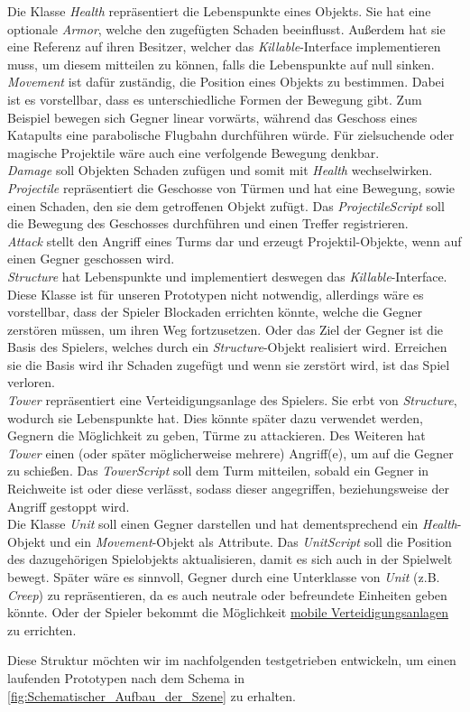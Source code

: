 Die Klasse \textit{Health} repräsentiert die Lebenspunkte eines Objekts. Sie hat eine optionale \textit{Armor}, welche den zugefügten Schaden beeinflusst. Außerdem hat sie eine Referenz auf ihren Besitzer, welcher das \textit{Killable}-Interface implementieren muss, um diesem mitteilen zu können, falls die Lebenspunkte auf null sinken.\\
\textit{Movement} ist dafür zuständig, die Position eines Objekts zu bestimmen. Dabei ist es vorstellbar, dass es unterschiedliche Formen der Bewegung gibt. Zum Beispiel bewegen sich Gegner linear vorwärts, während das Geschoss eines Katapults eine parabolische Flugbahn durchführen würde. Für zielsuchende oder magische Projektile wäre auch eine verfolgende Bewegung denkbar.\\
\textit{Damage} soll Objekten Schaden zufügen und somit mit \textit{Health} wechselwirken.\\
\textit{Projectile} repräsentiert die Geschosse von Türmen und hat eine Bewegung, sowie einen Schaden, den sie dem getroffenen Objekt zufügt. Das \textit{ProjectileScript} soll die Bewegung des Geschosses durchführen und einen Treffer registrieren.\\
\textit{Attack} stellt den Angriff eines Turms dar und erzeugt Projektil-Objekte, wenn auf einen Gegner geschossen wird.\\
\textit{Structure} hat Lebenspunkte und implementiert deswegen das \textit{Killable}-Interface. Diese Klasse ist für unseren Prototypen nicht notwendig, allerdings wäre es vorstellbar, dass der Spieler Blockaden errichten könnte, welche die Gegner zerstören müssen, um ihren Weg fortzusetzen. Oder das Ziel der Gegner ist die Basis des Spielers, welches durch ein \textit{Structure}-Objekt realisiert wird. Erreichen sie die Basis wird ihr Schaden zugefügt und wenn sie zerstört wird, ist das Spiel verloren.\\
\textit{Tower} repräsentiert eine Verteidigungsanlage des Spielers. Sie erbt von \textit{Structure}, wodurch sie Lebenspunkte hat. Dies könnte später dazu verwendet werden, Gegnern die Möglichkeit zu geben, Türme zu attackieren. Des Weiteren hat \textit{Tower} einen (oder später möglicherweise mehrere) Angriff(e), um auf die Gegner zu schießen. Das \textit{TowerScript} soll dem Turm mitteilen, sobald ein Gegner in Reichweite ist oder diese verlässt, sodass dieser angegriffen, beziehungsweise der Angriff gestoppt wird.\\
Die Klasse \textit{Unit} soll einen Gegner darstellen und hat dementsprechend ein \textit{Health}-Objekt und ein \textit{Movement}-Objekt als Attribute. Das \textit{UnitScript} soll die Position des dazugehörigen Spielobjekts aktualisieren, damit es sich auch in der Spielwelt bewegt. Später wäre es sinnvoll, Gegner durch eine Unterklasse von \textit{Unit} (z.B. \textit{Creep}) zu repräsentieren, da es auch neutrale oder befreundete Einheiten geben könnte. Oder der Spieler bekommt die Möglichkeit \hyperlink{DefinitionMobileEinheit}{mobile Verteidigungsanlagen} zu errichten.

Diese Struktur möchten wir im nachfolgenden testgetrieben entwickeln, um einen laufenden Prototypen nach dem Schema in \autoref{fig:Schematischer_Aufbau_der_Szene} zu erhalten.
